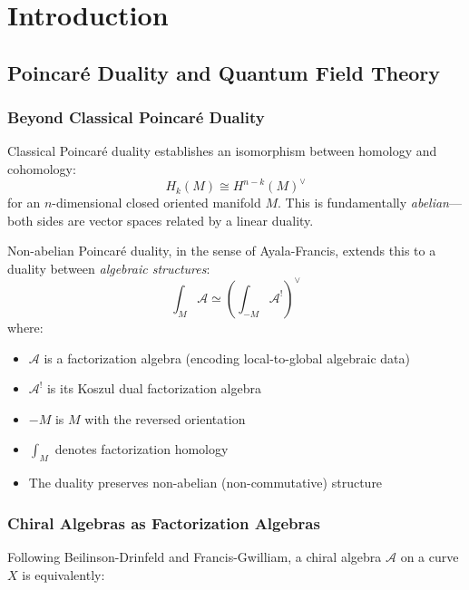 \chapter{Introduction}

\section{Poincaré Duality and Quantum Field Theory}
\label{sec:nonabelian-poincare-intro}

\subsection{Beyond Classical Poincaré Duality}

Classical Poincaré duality establishes an isomorphism between homology and cohomology:
\begin{equation}
H_k(M) \cong H^{n-k}(M)^\vee
\end{equation}
for an $n$-dimensional closed oriented manifold $M$. This is fundamentally \emph{abelian}—both sides are vector spaces related by a linear duality.

\begin{principle}
\label{prin:nonabelian-poincare}
Non-abelian Poincaré duality, in the sense of Ayala-Francis, extends this to a duality between \emph{algebraic structures}:
\begin{equation}
\int_M \mathcal{A} \simeq \left(\int_{-M} \mathcal{A}^!\right)^\vee
\end{equation}
where:
\begin{itemize}
\item $\mathcal{A}$ is a factorization algebra (encoding local-to-global algebraic data)
\item $\mathcal{A}^!$ is its Koszul dual factorization algebra
\item $-M$ is $M$ with the reversed orientation
\item $\int_M$ denotes factorization homology
\item The duality preserves non-abelian (non-commutative) structure
\end{itemize}
\end{principle}

\subsection{Chiral Algebras as Factorization Algebras}

Following Beilinson-Drinfeld and Francis-Gwilliam, a chiral algebra $\mathcal{A}$ on a curve $X$ is equivalently:

